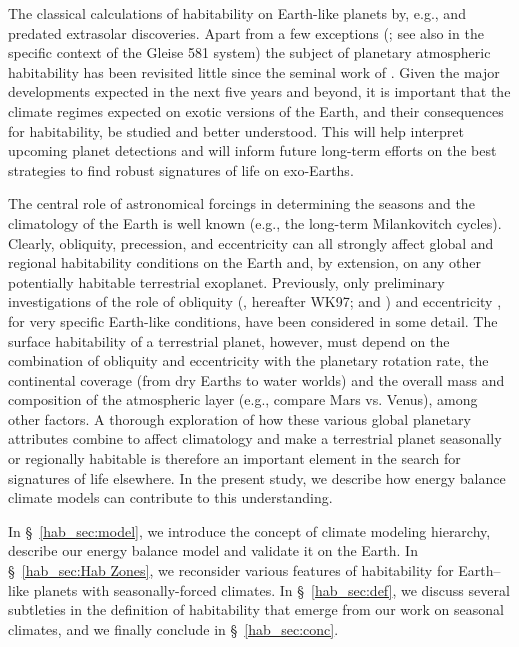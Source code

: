 The classical calculations of habitability on Earth-like planets by,
e.g., \citet{dole1964} and \citet{hart1979} predated extrasolar
discoveries. Apart from a few exceptions
(\citealt{franck_et_al2000b,gaidos_et_al2005}; see also
\citealt{vonbloh_et_al2008,selsis_et_al2007} in the specific context
of the Gleise 581 system) the subject of planetary atmospheric
habitability has been revisited little since the seminal work of
\citet{kasting_et_al1993}. Given the major developments expected in
the next five years and beyond, it is important that the climate
regimes expected on exotic versions of the Earth, and their
consequences for habitability, be studied and better understood.  This
will help interpret upcoming planet detections and will inform future
long-term efforts on the best strategies to find robust signatures of
life on exo-Earths.

The central role of astronomical forcings in determining the seasons
and the climatology of the Earth is well known (e.g., the long-term
Milankovitch cycles).  Clearly, obliquity, precession, and
eccentricity can all strongly affect global and regional habitability
conditions on the Earth and, by extension, on any other potentially
habitable terrestrial exoplanet.  Previously, only preliminary
investigations of the role of obliquity
(\citealt{williams+kasting1997}, hereafter WK97; and
\citealt{williams+pollard2003}) and eccentricity
\citep{williams+pollard2002}, for very specific Earth-like conditions,
have been considered in some detail. The surface habitability of a
terrestrial planet, however, must depend on the combination of
obliquity and eccentricity with the planetary rotation rate, the
continental coverage (from dry Earths to water worlds) and the overall
mass and composition of the atmospheric layer (e.g., compare Mars
vs. Venus), among other factors.  A thorough exploration of how these
various global planetary attributes combine to affect climatology and
make a terrestrial planet seasonally or regionally habitable is
therefore an important element in the search for signatures of life
elsewhere. In the present study, we describe how energy balance
climate models can contribute to this understanding.

In \S~\ref{hab_sec:model}, we introduce the concept of climate
modeling hierarchy, describe our energy balance model and validate it
on the Earth.  In \S~\ref{hab_sec:Hab Zones}, we reconsider various
features of habitability for Earth--like planets with
seasonally-forced climates.  In \S~\ref{hab_sec:def}, we discuss
several subtleties in the definition of habitability that emerge from
our work on seasonal climates, and we finally conclude in
\S~\ref{hab_sec:conc}.


